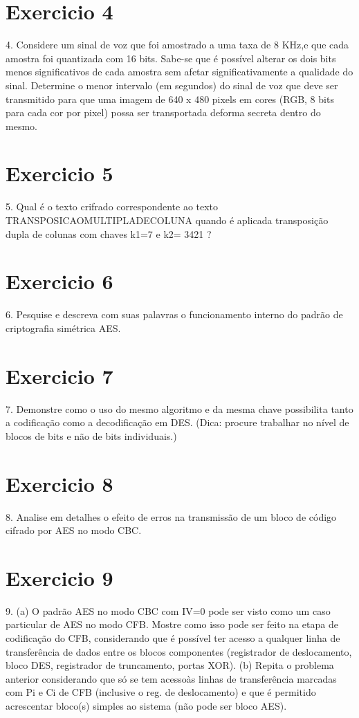 \documentclass[10pt,a4paper]{article}
\begin{document}
\section*{Exercicio 4}
4. Considere um sinal de voz que foi amostrado a uma taxa de 8 KHz,e que cada amostra foi quantizada com 16 bits. Sabe-se que é possível alterar os dois bits menos significativos de cada amostra sem afetar significativamente a qualidade do sinal. Determine o menor intervalo (em segundos) do sinal de voz que deve ser transmitido para que uma imagem de 640 x 480 pixels em cores (RGB, 8 bits para cada cor por pixel) possa ser transportada deforma secreta dentro do mesmo.
\section*{Exercicio 5}
5. Qual é o texto crifrado correspondente ao texto
TRANSPOSICAOMULTIPLADECOLUNA
quando é aplicada transposição dupla de colunas com chaves k1=7 e k2= 3421 ?
\section*{Exercicio 6}
6. Pesquise e descreva com suas palavras o funcionamento interno do padrão de criptografia simétrica AES.
\section*{Exercicio 7}
7. Demonstre como o uso do mesmo algoritmo e da mesma chave possibilita tanto a codificação como a decodificação em DES. (Dica: procure trabalhar no nível de blocos de bits e não de bits individuais.)
\section*{Exercicio 8}
8. Analise em detalhes o efeito de erros na transmissão de um bloco de código cifrado por AES no modo CBC.
\section*{Exercicio 9}
9. (a) O padrão AES no modo CBC com IV=0 pode ser visto como um caso particular de AES no modo CFB. Mostre como isso pode ser feito na etapa de codificação do CFB, considerando que é possível ter acesso a qualquer linha de transferência de dados entre os blocos componentes (registrador de deslocamento, bloco DES, registrador de truncamento, portas XOR).
(b) Repita o problema anterior considerando que só se tem acessoàs linhas de transferência marcadas com Pi e Ci de CFB (inclusive o reg. de deslocamento) e que é permitido acrescentar bloco(s) simples ao sistema (não pode ser bloco AES).
\end{document}
